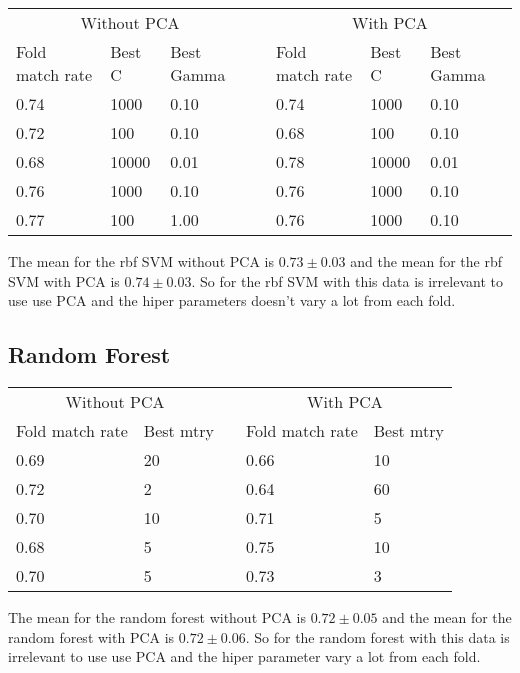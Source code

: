 \documentclass{article}
\begin{document}
\begin{table}[h]
    \begin{tabular}{|l|l|l|l|l|l|l|}
    \cline{1-3} \cline{5-7}
    \multicolumn{3}{|c|}{Without PCA} &  & \multicolumn{3}{|c|}{With PCA} \\ \cline{1-3} \cline{5-7}
    Fold match rate & Best C & Best Gamma &  & Fold match rate & Best C & Best Gamma  \\ \cline{1-3} \cline{5-7}
    0.74 & 1000  & 0.10 &  & 0.74 & 1000  & 0.10 \\ \cline{1-3} \cline{5-7}
    0.72 & 100   & 0.10 &  & 0.68 & 100   & 0.10 \\ \cline{1-3} \cline{5-7}
    0.68 & 10000 & 0.01 &  & 0.78 & 10000 & 0.01 \\ \cline{1-3} \cline{5-7}
    0.76 & 1000  & 0.10 &  & 0.76 & 1000  & 0.10 \\ \cline{1-3} \cline{5-7}
    0.77 & 100   & 1.00 &  & 0.76 & 1000  & 0.10 \\ \cline{1-3} \cline{5-7}
    \end{tabular}
\end{table}

The mean for the rbf SVM without PCA is $0.73 \pm 0.03$ and the mean for the rbf SVM with PCA is $0.74 \pm 0.03$. So for the rbf SVM with this data is irrelevant to use use PCA and the hiper parameters doesn't vary a lot from each fold.

\subsection{Random Forest}

\begin{table}[h]
    \begin{tabular}{|l|l|l|l|l|}
    \cline{1-2} \cline{4-5}
    \multicolumn{2}{|c|}{Without PCA} &  & \multicolumn{2}{|c|}{With PCA} \\ \cline{1-2} \cline{4-5}
    Fold match rate & Best mtry &  & Fold match rate & Best mtry  \\ \cline{1-2} \cline{4-5}
    0.69 & 20 &  & 0.66 & 10  \\ \cline{1-2} \cline{4-5}
    0.72 & 2  &  & 0.64 & 60  \\ \cline{1-2} \cline{4-5}
    0.70 & 10 &  & 0.71 & 5   \\ \cline{1-2} \cline{4-5}
    0.68 & 5  &  & 0.75 & 10  \\ \cline{1-2} \cline{4-5}
    0.70 & 5  &  & 0.73 & 3   \\ \cline{1-2} \cline{4-5}
    \end{tabular}
\end{table}

The mean for the random forest without PCA is $0.72 \pm 0.05$ and the mean for the random forest with PCA is $0.72 \pm 0.06$. So for the random forest with this data is irrelevant to use use PCA and the hiper parameter vary a lot from each fold.
\end{document}
